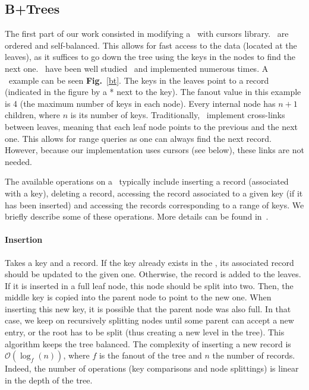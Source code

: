 \subsection{B+Trees}
The first part of our work consisted in modifying a \btrees\ with cursors library.
\btrees\ are ordered and self-balanced.
This allows for fast access to the data (located at the leaves), as it suffices to go down the tree using the keys in the nodes to find the next one.
\btrees\ have been well studied~\cite{dbms} and implemented numerous times. %
A \btree\ example can be seen \textbf{Fig.}~\ref{bt}.
The keys in the leaves point to a record (indicated in the figure by a * next to the key).
The fanout value in this example is 4 (the maximum number of keys in each node).
Every internal node has $n+1$ children, where $n$ is its number of keys.
Traditionally, \btrees\ implement cross-links between leaves, meaning that each leaf node points to the previous and the next one.
This allows for range queries as one can always find the next record.
However, because our implementation uses cursors (see below), these links are not needed.

The available operations on a \btree\ typically include inserting a record (associated with a key), deleting a record, accessing the record associated to a given key (if it has been inserted) and accessing the records corresponding to a range of keys.
We briefly describe some of these operations. More details can be found in~\cite{dbms}.
\paragraph{Insertion} Takes a key and a record.
If the key already exists in the \btree, its associated record should be updated to the given one. Otherwise, the record is added to the leaves.
If it is inserted in a full leaf node, this node should be split into two. Then, the middle key is copied into the parent node to point to the new one.
When inserting this new key, it is possible that the parent node was also full.
In that case, we keep on recursively splitting nodes until some parent can accept a new entry, or the root has to be split (thus creating a new level in the tree).
This algorithm keeps the tree balanced.
The complexity of inserting a new record is $\mathcal{O}(\log_{f}(n))$, where $f$ is the fanout of the tree and $n$ the number of records.
Indeed, the number of operations (key comparisons and node splittings) is linear in the depth of the tree.

